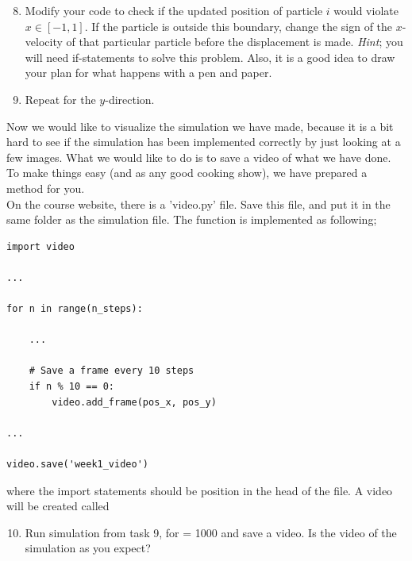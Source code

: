 \documentclass{article}
\begin{document}
\begin{enumerate}
  \setcounter{enumi}{7}
  \item Modify your code to check if the updated position of particle $i$ would violate $x \in [-1,1]$.
      If the particle is outside this boundary, change the sign of the $x$-velocity of that
      particular particle before the displacement is made.
      {\em Hint}; you will need if-statements to solve this problem. Also, it
      is a good idea to draw your plan for what happens with a pen and paper.

  \item Repeat for the $y$-direction.

\end{enumerate}


Now we would like to visualize the simulation we have made, because
it is a bit hard to see if the simulation has been implemented correctly by
just looking at a few images.
What we would like to do is to save a video of what we have done.
To make things easy (and as any good cooking show), we have prepared
a method for you. \\

On the course website, there is a 'video.py' file.
Save this file, and put it in the same folder as the simulation file.
The function is implemented as following;

\begin{lstlisting}
import video

...

for n in range(n_steps):

    ...

    # Save a frame every 10 steps
    if n % 10 == 0:
        video.add_frame(pos_x, pos_y)

...

video.save('week1_video')

\end{lstlisting}

where the import statements should be position in the head of the file.
A video will be created called 

\begin{enumerate}
  \setcounter{enumi}{9}
  \item Run simulation from task 9, for  = 1000 and save a video.
    Is the video of the simulation as you expect?

\end{enumerate}


\end{document}
